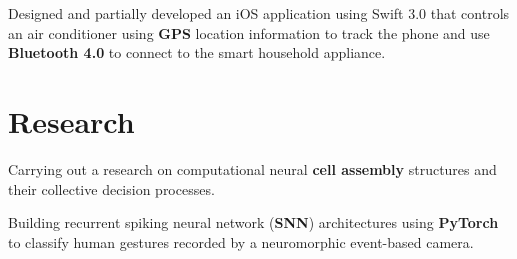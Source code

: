 \documentclass[letterpaper]{deedy-resume} %
\begin{document}
\begin{minipage}[t]{0.66\textwidth}
\begin{tightitemize}
\item Designed and partially developed an iOS application using Swift 3.0 that controls an air conditioner using \textbf{GPS} location information to track the phone and use \textbf{Bluetooth 4.0} to connect to the smart household appliance.
\end{tightitemize}

\sectionspace %


%

%


\section{Research}

\sectionspace %

\begin{tightitemize}
\item Carrying out a research on computational neural \textbf{cell assembly} structures and their collective decision processes.
\item Building recurrent spiking neural network (\textbf{SNN}) architectures using \textbf{PyTorch} to classify human gestures recorded by a neuromorphic event-based camera.
\end{tightitemize}


\end{minipage}
\end{document}
